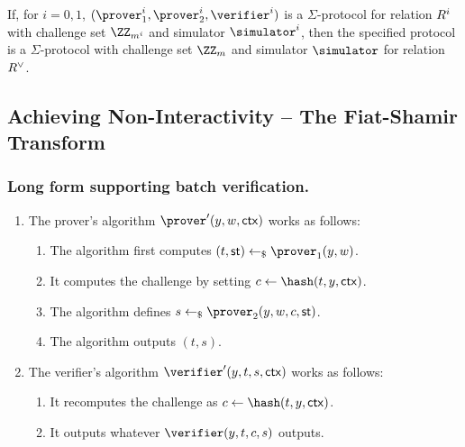 \documentclass[runningheads]{llncs}
\begin{document}
\begin{theorem}
  If, for $i=0,1$, $(\prover_1^i,\prover_2^i,\verifier^i)$ is a $\Sigma$-protocol for relation $R^i$ with challenge set $\ZZ_{m^i}$ and simulator $\simulator^i$, then the specified protocol is a $\Sigma$-protocol with challenge set $\ZZ_m$ and simulator $\simulator$ for relation $R^\lor$.
\end{theorem}




\subsection{Achieving Non-Interactivity -- The Fiat-Shamir Transform}

\subsubsection{Long form supporting batch verification.}
\begin{enumerate}
  \item
    The prover's algorithm $\prover'(y,w,\ctx)$ works as follows:
    \begin{enumerate}
      \item
        The algorithm first computes $(t,\st)\getsr\prover_1(y,w)$.
      \item
        It computes the challenge by setting $c\gets\hash(t,y,\ctx)$.
      \item
        The algorithm defines $s\getsr\prover_2(y,w,c,\st)$.
      \item
        The algorithm outputs $(t,s)$.
    \end{enumerate}
  \item
    The verifier's algorithm $\verifier'(y,t,s,\ctx)$ works as follows:
    \begin{enumerate}
      \item
        It recomputes the challenge as $c\gets\hash(t,y,\ctx)$.
      \item
        It outputs whatever $\verifier(y,t,c,s)$ outputs.
    \end{enumerate}
\end{enumerate}
\end{document}
